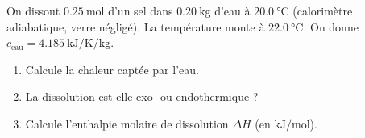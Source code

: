 \documentclass[11pt,a4paper]{article}
\begin{document}
\begin{exo}
On dissout $\qty{0.25}{\mol}$ d'un sel dans $\qty{0.20}{\kilogram}$ d'eau à $\qty{20.0}{\celsius}$ (calorimètre adiabatique, verre négligé). La température monte à $\qty{22.0}{\celsius}$. On donne $c_{\text{eau}}=\qty{4.185}{\kilo\joule\per\kelvin\per\kilogram}$.
\begin{enumerate}[label=\alph*)]
  \item Calcule la chaleur captée par l'eau.
  \item La dissolution est-elle exo- ou endothermique ?
  \item Calcule l'enthalpie molaire de dissolution $\Delta H$ (en $\si{\kilo\joule\per\mol}$).
\end{enumerate}
\end{exo}
\end{document}
